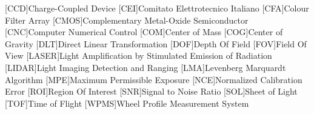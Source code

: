 \begin{acronym}
  [CCD]{Charge-Coupled Device}
  [CEI]{Comitato Elettrotecnico Italiano}
  [CFA]{Colour Filter Array}
  [CMOS]{Complementary Metal-Oxide Semiconductor}
  [CNC]{Computer Numerical Control}
  [COM]{Center of Mass}
  [COG]{Center of Gravity}
  [DLT]{Direct Linear Transformation}
  [DOF]{Depth Of Field}
  [FOV]{Field Of View}
  [LASER]{Light Amplification by Stimulated Emission of Radiation}
  [LIDAR]{Light Imaging Detection and Ranging}
  [LMA]{Levenberg Marquardt Algorithm}
  [MPE]{Maximum Permissible Exposure}
  [NCE]{Normalized Calibration Error}
  [ROI]{Region Of Interest}
  [SNR]{Signal to Noise Ratio}
  [SOL]{Sheet of Light}
  [TOF]{Time of Flight}
  [WPMS]{Wheel Profile Measurement System}
\end{acronym}